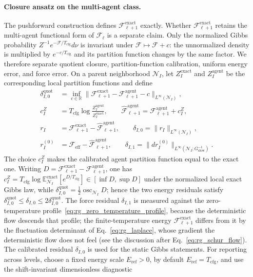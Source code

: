 \paragraph{Closure ansatz on the multi-agent class.}
The pushforward construction defines $\mathcal{F}^{\mathrm{exact}}_{\ell+1}$ exactly. Whether $\mathcal{F}^{\mathrm{exact}}_{\ell+1}$ retains the multi-agent functional form of $\mathcal{F}_\ell$ is a separate claim. Only the normalized Gibbs probability $Z^{-1}e^{-\mathcal{F}/T_{\mathrm{cfg}}}d\nu$ is invariant under $\mathcal{F}\mapsto\mathcal{F}+c$: the unnormalized density is multiplied by $e^{-c/T_{\mathrm{cfg}}}$ and its partition function changes by the same factor. We therefore separate quotient closure, partition-function calibration, uniform energy error, and force error. On a parent neighborhood $\mathcal{N}_I$, let $Z_I^{\mathrm{exact}}$ and $Z_I^{\mathrm{agent}}$ be the corresponding local partition functions and define
\begin{align}
\delta_{I,0}^{\mathrm{quot}}
 &= \inf_{c\in\mathbb{R}}\big\|\mathcal{F}^{\mathrm{exact}}_{\ell+1}-\mathcal{F}^{\mathrm{agent}}_{\ell+1}-c\big\|_{L^\infty(\mathcal{N}_I)}, \nonumber\\
c_I^Z
 &= T_{\mathrm{cfg}}\log\frac{Z_I^{\mathrm{agent}}}{Z_I^{\mathrm{exact}}}, \qquad
\widehat{\mathcal{F}}^{\mathrm{agent}}_{\ell+1}=\mathcal{F}^{\mathrm{agent}}_{\ell+1}+c_I^Z, \nonumber\\
r_I
 &= \mathcal{F}^{\mathrm{exact}}_{\ell+1}-\widehat{\mathcal{F}}^{\mathrm{agent}}_{\ell+1}, \qquad
\delta_{I,0}=\|r_I\|_{L^\infty(\mathcal{N}_I)}, \nonumber\\
r_I^{(0)}
 &= \mathcal{F}_{\mathrm{eff}}-\widehat{\mathcal{F}}^{\mathrm{agent}}_{\ell+1}, \qquad
\delta_{I,1}
 = \|dr_I^{(0)}\|_{L^\infty(\mathcal{N}_I;G_{\mathrm{slow}}^{-1})}.
\label{eq:rg_closure}
\end{align}
The choice $c_I^Z$ makes the calibrated agent partition function equal to the exact one. Writing $D=\mathcal{F}^{\mathrm{exact}}_{\ell+1}-\mathcal{F}^{\mathrm{agent}}_{\ell+1}$, one has $c_I^Z=T_{\mathrm{cfg}}\log\mathbb{E}^{\mathrm{exact}}_{\mathcal{N}_I}[e^{D/T_{\mathrm{cfg}}}]\in[\inf D,\sup D]$ under the normalized local exact Gibbs law, while $\delta^{\mathrm{quot}}_{I,0}=\tfrac12\operatorname{osc}_{\mathcal{N}_I}D$; hence the two energy residuals satisfy $\delta^{\mathrm{quot}}_{I,0}\le\delta_{I,0}\le2\delta^{\mathrm{quot}}_{I,0}$. The force residual $\delta_{I,1}$ is measured against the zero-temperature profile~\eqref{eq:rg_zero_temperature_profile}, because the deterministic flow descends that profile; the finite-temperature energy $\mathcal{F}^{\mathrm{exact}}_{\ell+1}$ differs from it by the fluctuation determinant of Eq.~\eqref{eq:rg_laplace}, whose gradient the deterministic flow does not feel (see the discussion after Eq.~\eqref{eq:rg_schur_flow}). The calibrated residual $\delta_{I,0}$ is used for the static Gibbs statements. For reporting across levels, choose a fixed energy scale $E_{\mathrm{ref}}>0$, by default $E_{\mathrm{ref}}=T_{\mathrm{cfg}}$, and use the shift-invariant dimensionless diagnostic
